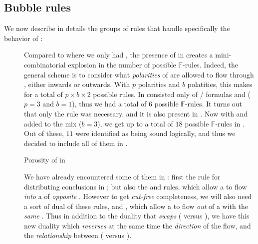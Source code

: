 \subsection{Bubble rules}

We now describe in details the groups of rules that handle specifically the
behavior of :

\begin{description}
  \item[\flow]

  Compared to  where we only had  , the presence of
    in  creates a mini-combinatorial
  explosion in the number of possible $\mathbb{F}$-rules. Indeed, the general
  scheme is to consider what \emph{polarities} of  are allowed to flow
  through , either inwards or outwards. With $p$  polarities and
  $b$  polatities, this makes for a total of $p \times b \times 2$
  possible rules. In   consisted only of
  / formulas and   ($p = 3$
  and $b = 1$), thus we had a total of $6$ possible $\mathbb{F}$-rules. It turns
  out that only the  rule was necessary, and it is also present in
  . Now with  and   added to
  the mix ($b = 3$), we get up to a total of $18$ possible $\mathbb{F}$-rules in
  . Out of these, $11$ were identified as being sound logically,
  and thus we decided to include all of them in .

  \begin{marginfigure}
    \caption{Porosity of  in }
  \end{marginfigure}
  
  We have already encountered some of them in : first the
   rule for distributing conclusions in ; but also
  the  and  rules, which allow a
    to flow \emph{into} a  of \emph{opposite}
  . However to get \emph{cut-free} completeness, we will also need
  a sort of dual of these rules,  and , which
  allow a   to flow \emph{out} of a  with the
  \emph{same} . Thus in addition to the duality that \emph{swaps}
   ( versus ), we have this new
  duality which \emph{reverses} at the same time the \emph{direction} of the
  flow, and the \emph{relationship} between  (
  versus ).


\end{description}

